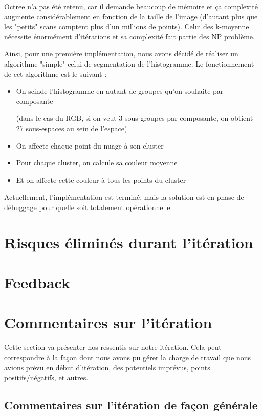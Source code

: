 \documentclass[12pt,titlepage,french]{article}
\begin{document}
Octree n'a pas été retenu, car il demande beaucoup de mémoire et ça complexité augmente considérablement en fonction de la taille de l'image (d'autant plus que les "petits" scans comptent plus d'un millions de points). Celui des k-moyenne nécessite énormément d'itérations et sa complexité fait partie des NP problème.

Ainsi, pour une première implémentation, nous avons décidé de réaliser un algorithme "simple" celui de segmentation de l'histogramme. Le fonctionnement de cet algorithme est le suivant :
\begin{itemize}
    \item On scinde l'histogramme en autant de groupes qu'on souhaite par composante
    
    (dans le cas du RGB, si on veut 3 sous-groupes par composante, on obtient 27 sous-espaces au sein de l'espace)
    \item On affecte chaque point du nuage à son cluster
    \item Pour chaque cluster, on calcule sa couleur moyenne
    \item Et on affecte cette couleur à tous les points du cluster
\end{itemize}

Actuellement, l'implémentation est terminé, mais la solution est en phase de débuggage pour quelle soit totalement opérationnelle.

\section{Risques éliminés durant l'itération}


\section{Feedback}



\section{Commentaires sur l'itération}

Cette section va présenter nos ressentis sur notre itération. Cela peut correspondre à la façon dont nous avons pu gérer la charge de travail que nous avions prévu en début d'itération, des potentiels imprévus, points positifs/négatifs, et autres.

\subsection{Commentaires sur l'itération de façon générale}
\end{document}
